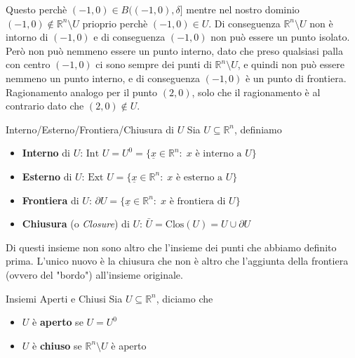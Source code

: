 \documentclass{rapport}
\begin{document}
Questo perchè $(-1,0) \in B((-1,0), \delta]$ mentre nel nostro dominio $(-1,0) \notin \mathbb{R}^n\setminus U$ prioprio perchè $(-1,0) \in U$. Di conseguenza $ \mathbb{R}^n\setminus U$ non è intorno di $(-1,0)$ e di conseguenza $(-1,0)$ non può essere un punto isolato. Però non può nemmeno essere un punto interno, dato che preso qualsiasi palla con centro $(-1,0)$ ci sono sempre dei punti di $\mathbb{R}^n\setminus U$, e quindi non può essere nemmeno un punto interno, e di conseguenza $(-1, 0)$ è un punto di frontiera. Ragionamento analogo per il punto $(2,0)$, solo che il ragionamento è al contrario dato che $(2,0) \notin U$. 



\begin{definizione}{Interno/Esterno/Frontiera/Chiusura di $U$}{}
  Sia $U\subseteq\mathbb{R}^n$, definiamo 
  \begin{center}
    
  \begin{itemize}
    \item \textbf{Interno} di $U$:  
    $
    \text{Int }U = U^0 = \{\underline{x}\in\mathbb{R}^n: \; x \text{ è interno a } U\}
    $
    \item \textbf{Esterno} di $U$: 
    $
    \text{Ext }U  = \{\underline{x}\in\mathbb{R}^n: \; x \text{ è esterno a } U\}
    $
    \item \textbf{Frontiera} di $U$:  
    $
    \partial U  = \{\underline{x}\in\mathbb{R}^n: \; x \text{ è frontiera di } U\}
    $
    \item \textbf{Chiusura} (o \textit{Closure}) di $U$: 
    $
   \bar{U}  = \text{Clos}(U) = U \cup \partial U
    $
  \end{itemize} 
  \end{center}
\end{definizione}

Di questi insieme non sono altro che l'insieme dei punti che abbiamo definito prima. L'unico nuovo è la chiusura che non è altro che l'aggiunta della frontiera (ovvero del "bordo") all'insieme originale.

\begin{definizione}{Insiemi Aperti e Chiusi}{}
  Sia $U\subseteq\mathbb{R}^n$, diciamo che 


  \begin{center}    
  \begin{itemize}
    \item $U$ è \textbf{aperto} se $U = U^0$
    \item $U$ è \textbf{chiuso} se $\mathbb{R}^n\setminus U$ è aperto
  \end{itemize}
\end{center}

  \end{definizione}
\end{document}
